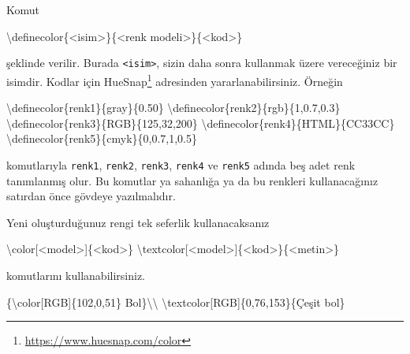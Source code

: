 \documentclass[
  10pt,
]{scrbook}
\newenvironment{Shaded}{\begin{snugshade}}{\end{snugshade}}
\newcommand{\FunctionTok}[1]{\textcolor[rgb]{0.00,0.00,0.00}{#1}}
\newcommand{\NormalTok}[1]{#1}
\renewcommand{\href}[2]{#2\footnote{\url{#1}}}
\theoremstyle{definition}
\theoremstyle{definition}
\theoremstyle{definition}
\theoremstyle{definition}
\theoremstyle{remark}
\begin{document}
Komut

\begin{Shaded}
\begin{Highlighting}[]
\FunctionTok{\textbackslash{}definecolor}\NormalTok{\{\textless{}isim\textgreater{}\}\{\textless{}renk modeli\textgreater{}\}\{\textless{}kod\textgreater{}\}}
\end{Highlighting}
\end{Shaded}

şeklinde verilir. Burada \texttt{\textless{}isim\textgreater{}}, sizin daha sonra kullanmak üzere vereceğiniz bir isimdir. Kodlar için \href{https://www.huesnap.com/color}{HueSnap} adresinden yararlanabilirsiniz. Örneğin

\begin{Shaded}
\begin{Highlighting}[]
\FunctionTok{\textbackslash{}definecolor}\NormalTok{\{renk1\}\{gray\}\{0.50\}}
\FunctionTok{\textbackslash{}definecolor}\NormalTok{\{renk2\}\{rgb\}\{1,0.7,0.3\}}
\FunctionTok{\textbackslash{}definecolor}\NormalTok{\{renk3\}\{RGB\}\{125,32,200\}}
\FunctionTok{\textbackslash{}definecolor}\NormalTok{\{renk4\}\{HTML\}\{CC33CC\}}
\FunctionTok{\textbackslash{}definecolor}\NormalTok{\{renk5\}\{cmyk\}\{0,0.7,1,0.5\}}
\end{Highlighting}
\end{Shaded}

komutlarıyla \texttt{renk1}, \texttt{renk2}, \texttt{renk3}, \texttt{renk4} ve \texttt{renk5} adında beş adet renk tanımlanmış olur. Bu komutlar ya sahanlığa ya da bu renkleri kullanacağınız satırdan önce gövdeye yazılmalıdır.

Yeni oluşturduğunuz rengi tek seferlik kullanacaksanız

\begin{Shaded}
\begin{Highlighting}[]
\FunctionTok{\textbackslash{}color}\NormalTok{[\textless{}model\textgreater{}]\{\textless{}kod\textgreater{}\}}
\FunctionTok{\textbackslash{}textcolor}\NormalTok{[\textless{}model\textgreater{}]\{\textless{}kod\textgreater{}\}\{\textless{}metin\textgreater{}\}}
\end{Highlighting}
\end{Shaded}

komutlarını kullanabilirsiniz.

\begin{Shaded}
\begin{Highlighting}[]
\NormalTok{\{}\FunctionTok{\textbackslash{}color}\NormalTok{[RGB]\{102,0,51\} Bol\}}\FunctionTok{\textbackslash{}\textbackslash{}}
\FunctionTok{\textbackslash{}textcolor}\NormalTok{[RGB]\{0,76,153\}\{Çeşit bol\}}
\end{Highlighting}
\end{Shaded}
\end{document}
